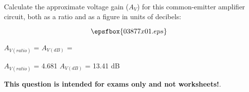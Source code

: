 

Calculate the approximate voltage gain ($A_V$) for this common-emitter amplifier circuit, both as a ratio and as a figure in units of decibels:

$$\epsfbox{03877x01.eps}$$

$A_{V(ratio)}$ = \hskip 80pt $A_{V(dB)}$ = 







$A_{V(ratio)}$ = 4.681 \hskip 50pt $A_{V(dB)}$ = 13.41 dB







{\bf This question is intended for exams only and not worksheets!}.



